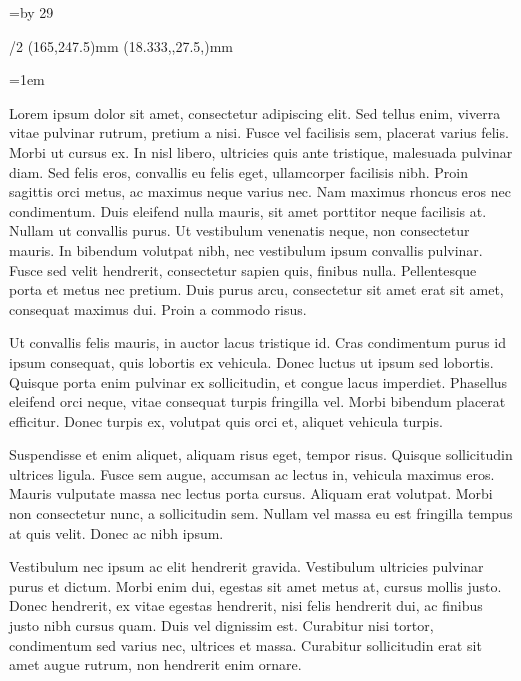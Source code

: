 \fontfam[ebgaramond]
\typosize[12/15.6]

\hsize=110mm
\vsize=\topskip \advance\vsize by 29\baselineskip\relax

\margins/2 (165,247.5)mm (18.333,,27.5,)mm

\parskip=0pt
\parindent=1em

\baselineskip

\noindent
Lorem ipsum dolor sit amet, consectetur adipiscing elit. Sed tellus enim, viverra vitae pulvinar rutrum, pretium a nisi. Fusce vel facilisis sem, placerat varius felis. Morbi ut cursus ex. In nisl libero, ultricies quis ante tristique, malesuada pulvinar diam. Sed felis eros, convallis eu felis eget, ullamcorper facilisis nibh. Proin sagittis orci metus, ac maximus neque varius nec. Nam maximus rhoncus eros nec condimentum. Duis eleifend nulla mauris, sit amet porttitor neque facilisis at. Nullam ut convallis purus. Ut vestibulum venenatis neque, non consectetur mauris. In bibendum volutpat nibh, nec vestibulum ipsum convallis pulvinar. Fusce sed velit hendrerit, consectetur sapien quis, finibus nulla. Pellentesque porta et metus nec pretium. Duis purus arcu, consectetur sit amet erat sit amet, consequat maximus dui. Proin a commodo risus.

Ut convallis felis mauris, in auctor lacus tristique id. Cras condimentum purus id ipsum consequat, quis lobortis ex vehicula. Donec luctus ut ipsum sed lobortis. Quisque porta enim pulvinar ex sollicitudin, et congue lacus imperdiet. Phasellus eleifend orci neque, vitae consequat turpis fringilla vel. Morbi bibendum placerat efficitur. Donec turpis ex, volutpat quis orci et, aliquet vehicula turpis.

Suspendisse et enim aliquet, aliquam risus eget, tempor risus. Quisque sollicitudin ultrices ligula. Fusce sem augue, accumsan ac lectus in, vehicula maximus eros. Mauris vulputate massa nec lectus porta cursus. Aliquam erat volutpat. Morbi non consectetur nunc, a sollicitudin sem. Nullam vel massa eu est fringilla tempus at quis velit. Donec ac nibh ipsum.

Vestibulum nec ipsum ac elit hendrerit gravida. Vestibulum ultricies pulvinar purus et dictum. Morbi enim dui, egestas sit amet metus at, cursus mollis justo. Donec hendrerit, ex vitae egestas hendrerit, nisi felis hendrerit dui, ac finibus justo nibh cursus quam. Duis vel dignissim est. Curabitur nisi tortor, condimentum sed varius nec, ultrices et massa. Curabitur sollicitudin erat sit amet augue rutrum, non hendrerit enim ornare.


